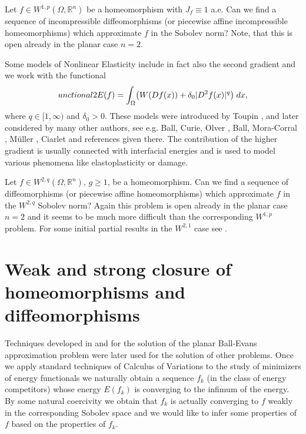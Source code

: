 \documentclass[12pt,a4paper]{amsart}
\theoremstyle{plain}
\theoremstyle{definition}
\def\eqn#1$$#2$${\begin{equation}\label#1#2\end{equation}}
\numberwithin{equation}{section}
\def\rn{\mathbb R^n}
\newcounter{problem}
\begin{document}
 Let $f\in W^{1,p}(\Omega,\rn)$ be a homeomorphism with $J_f\equiv 1$ a.e. Can we find a sequence of incompressible diffeomorphisms (or piecewise affine incompressible homeomorphisms) which approximate $f$ in the Sobolev norm? Note, that this is open already in the planar case $n=2$. 

\vskip 10pt

Some models of Nonlinear Elasticity include in fact also the second gradient and we work with the functional 
	\eqn{functional2}
	$$
	E(f)=\int_{\Omega}\bigl(W(Df(x))+\delta_0|D^2f(x)|^q \bigr)\; dx,
	$$
	where $q\in[1,\infty)$ and $\delta_0>0$. These models  
	were introduced by Toupin \cite{T}, \cite{T2}
	and later considered by many other authors, see e.g. Ball, Curie, Olver \cite{BCO}, Ball, Mora-Corral \cite{BMC}, M\"uller \cite[Section 6]{Mbook}, Ciarlet \cite[page 93]{Ci} and references given there. 
	The contribution of the higher gradient is usually connected with interfacial energies and is used to model various phenomena like elastoplasticity or damage.

 Let $f\in W^{2,q}(\Omega,\rn)$, $g\geq 1$, be a homeomorphism. Can we find a sequence of diffeomorphisms (or piecewise affine homeomorphisms) which approximate $f$ in the $W^{2,q}$ Sobolev norm? Again this problem is open already in the planar case $n=2$ and it seems to be much more difficult than the corresponding $W^{1,p}$ problem. For some initial partial results in the $W^{2,1}$ case see \cite{CH}.

\vskip 10pt

\section{Weak and strong closure of homeomorphisms and diffeomorphisms}

Techniques developed in \cite{IKO} and \cite{HP} for the solution of the planar Ball-Evans approximation problem were later used for the solution of other problems. Once we apply standard techniques of Calculus of Variations to the study of minimizers of energy functionals we naturally obtain a sequence $f_k$ (in the class of energy competitors) whose energy $E(f_k)$ is converging to the infimum of the energy. By some natural coercivity we obtain that $f_k$ is actually converging to $f$ weakly in the corresponding Sobolev space and we would like to infer some properties of $f$ based on the properties of $f_k$. 
\end{document}
